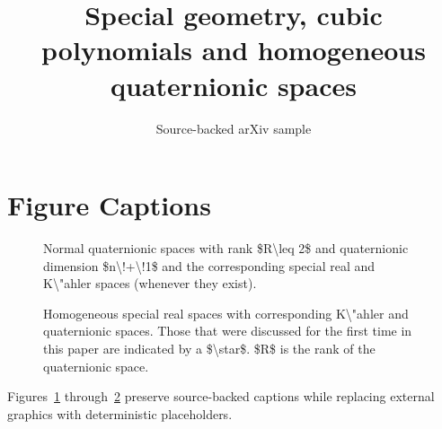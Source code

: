 \documentclass[11pt]{article}
\title{Special geometry, cubic polynomials and homogeneous quaternionic spaces}
\author{Source-backed arXiv sample}
\date{}
\begin{document}
\maketitle
\section{Figure Captions}

\begin{figure}[htbp]
\centering
\fbox{\rule{0pt}{1.15in}\rule{0.78\linewidth}{0pt}}
\caption{Normal quaternionic spaces with rank \$R\textbackslash{}leq 2\$ and quaternionic dimension \$n\textbackslash{}!+\textbackslash{}!1\$ and the corresponding special real and K\textbackslash{}"ahler spaces (whenever they exist).}
\label{fig:source-1}
\end{figure}


\begin{figure}[htbp]
\centering
\fbox{\rule{0pt}{1.15in}\rule{0.78\linewidth}{0pt}}
\caption{Homogeneous special real spaces with corresponding K\textbackslash{}"ahler and quaternionic spaces. Those that were discussed for the first time in this paper are indicated by a \$\textbackslash{}star\$. \$R\$ is the rank of the quaternionic space.}
\label{fig:source-2}
\end{figure}


Figures~\ref{fig:source-1} through~\ref{fig:source-2} preserve source-backed captions while replacing external graphics with deterministic placeholders.
\end{document}
